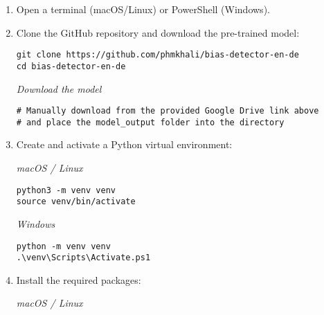 \begin{enumerate}
    \item Open a terminal (macOS/Linux) or PowerShell (Windows).
    
    \item Clone the GitHub repository and download the pre-trained model:
        
    \begin{tcolorbox}[colback=gray!10, colframe=gray!50, breakable, boxrule=0.4pt, sharp corners]
\begin{verbatim}
git clone https://github.com/phmkhali/bias-detector-en-de
cd bias-detector-en-de
\end{verbatim}
    \end{tcolorbox}
    
    \textit{Download the model}
    
    \begin{tcolorbox}[colback=gray!10, colframe=gray!50, breakable, boxrule=0.4pt, sharp corners]
\begin{verbatim}
# Manually download from the provided Google Drive link above
# and place the model_output folder into the directory
\end{verbatim}
    \end{tcolorbox}
    
    \item Create and activate a Python virtual environment:
    
    \textit{macOS / Linux}
    
    \begin{tcolorbox}[colback=gray!10, colframe=gray!50, breakable, boxrule=0.4pt, sharp corners]
\begin{verbatim}
python3 -m venv venv
source venv/bin/activate
\end{verbatim}
    \end{tcolorbox}
    
    \textit{Windows}
    
    \begin{tcolorbox}[colback=gray!10, colframe=gray!50, breakable, boxrule=0.4pt, sharp corners]
\begin{verbatim}
python -m venv venv
.\venv\Scripts\Activate.ps1
\end{verbatim}
    \end{tcolorbox}
    
    \item Install the required packages:
    
    \textit{macOS / Linux}
    

\end{enumerate}
